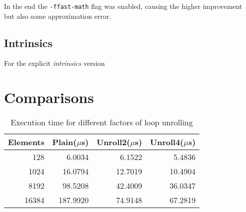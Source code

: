 \documentclass[12pt, a4paper]{article}
\begin{document}
In the end the \verb|-ffast-math| flag was enabled, causing the higher
improvement but also some approximation error.

\subsection{Intrinsics}

For the explicit \textit{intrinsics} version

\section{Comparisons}

\begin{table}[H]
	\centering
	\begin{tabular}{rrrr}
		\toprule
		Elements & Plain($\mu$s) & Unroll2($\mu$s) & Unroll4($\mu$s) \\
		\midrule
		128      & 6.0034        & 6.1522          & 5.4836          \\
		1024     & 16.0794       & 12.7019         & 10.4904         \\
		8192     & 98.5208       & 42.4009         & 36.0347         \\
		16384    & 187.9920      & 74.9148         & 67.2819         \\
		\bottomrule
	\end{tabular}
	\caption{Execution time for different factors of loop unrolling}
\end{table}
\end{document}
